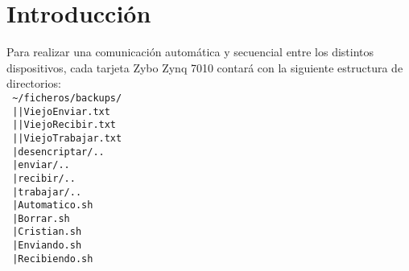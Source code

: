 \documentclass[12pt,letterpaper]{article}
\begin{document}
\section{Introducción}
Para realizar una comunicación automática y secuencial entre los distintos dispositivos, cada tarjeta Zybo Zynq 7010 contará con la siguiente estructura de directorios:\\

\texttt{
\textasciitilde/ficheros/backups/\\
\textcolor{white}{.}\hspace{3.15cm}|\hspace{1.8cm}|ViejoEnviar.txt\\
\textcolor{white}{.}\hspace{3.15cm}|\hspace{1.8cm}|ViejoRecibir.txt\\
\textcolor{white}{.}\hspace{3.15cm}|\hspace{1.8cm}|ViejoTrabajar.txt\\
\textcolor{white}{.}\hspace{3.15cm}|desencriptar/..\\
\textcolor{white}{.}\hspace{3.15cm}|enviar/..\\
\textcolor{white}{.}\hspace{3.15cm}|recibir/..\\
\textcolor{white}{.}\hspace{3.15cm}|trabajar/..\\
\textcolor{white}{.}\hspace{3.15cm}|Automatico.sh\\
\textcolor{white}{.}\hspace{3.15cm}|Borrar.sh\\
\textcolor{white}{.}\hspace{3.15cm}|Cristian.sh\\
\textcolor{white}{.}\hspace{3.15cm}|Enviando.sh\\
\textcolor{white}{.}\hspace{3.15cm}|Recibiendo.sh\\
}
\end{document}
